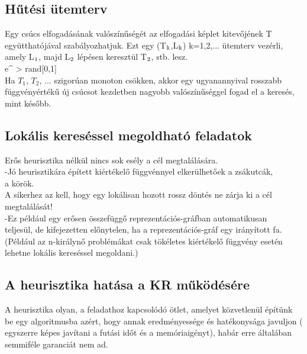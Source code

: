 \documentclass{article}
\begin{document}
	 \subsection{Hűtési ütemterv}
	 Egy csúcs elfogadásának valószínűségét az elfogadási képlet kitevőjének T együtthatójával szabályozhatjuk. Ezt egy (T$\textsubscript{k}$,L$\textsubscript{k}$) k=1,2,... ütemterv vezérli, amely L$\textsubscript{1}$, majd L$\textsubscript{2}$ lépésen keresztül T$\textsubscript{2}$, stb. lesz.\\
	 e^ > rand[0,1]\\
	 Ha $T_1$, $T_2$, ... szigorúan monoton csökken, akkor egy ugyanannyival rosszabb függvényértékű új csúcsot kezdetben nagyobb valószínűséggel fogad el a keresés, mint később.
	 
	 \subsection{Lokális kereséssel megoldható feladatok}
	 Erős heurisztika nélkül nincs sok esély a cél megtalálására.\\
	 \hspace*{0,5em} -Jó heurisztikára épített kiértékelő függvénnyel elkerülhetőek a zsákutcák,\\
	 \hspace*{0,5em} a körök.\\
	 A sikerhez az kell, hogy egy lokálisan hozott rossz döntés ne zárja ki a cél megtalálását!\\
	 \hspace*{0,5em} -Ez például egy erősen összefüggő reprezentációs-gráfban automatikusan \\
	 \hspace*{1em}teljesül, de kifejezetten előnytelen, ha a reprezentációs-gráf egy irányított fa. (Például az n-királynő problémákat csak tökéletes kiértékelő függvény esetén lehetne lokális kereséssel megoldani.)
	 
	 \subsection{A heurisztika hatása a KR működésére}
	 A heurisztika olyan, a feladathoz kapcsolódó ötlet, amelyet közvetlenül építünk be egy algoritmusba azért, hogy annak eredményessége és hatékonysága javuljon ( egyszerre képes javítani a futási időt és a memóriaigényt), habár erre általában semmiféle garanciát nem ad.
	 
	 
	
		
\end{document}
